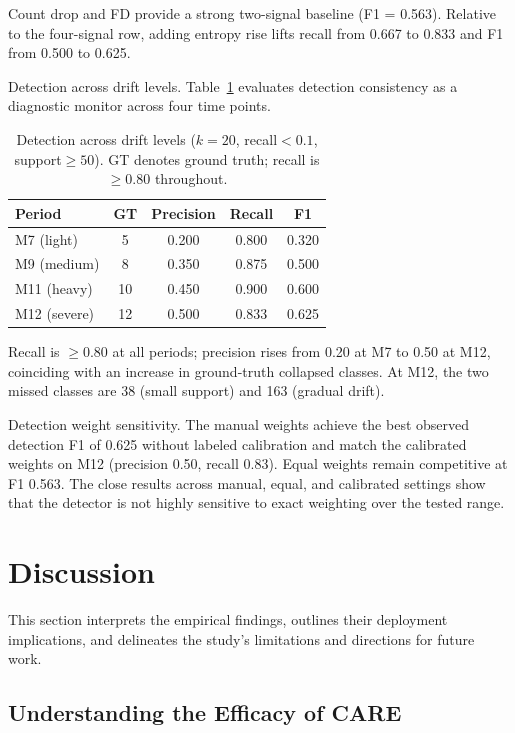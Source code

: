 \documentclass[journal]{IEEEtran}
\newcommand{\ours}{CARE}  %
\begin{document}
Count drop and FD provide a strong two-signal baseline (F1 = 0.563). Relative to the four-signal row, adding entropy rise lifts recall from 0.667 to 0.833 and F1 from 0.500 to 0.625.

Detection across drift levels.
Table~\ref{tab:trigger} evaluates detection consistency as a diagnostic monitor across four time points.

\begin{table}[!htbp]
\centering
\caption{Detection across drift levels ($k{=}20$, recall${<}0.1$, support${\geq}50$). GT denotes ground truth; recall is $\geq$0.80 throughout.}
\label{tab:trigger}
\small
\begin{tabular}{@{}l cccc@{}}
\toprule
Period & GT & Precision & Recall & F1 \\
\midrule
M7 (light)   & 5  & 0.200 & 0.800 & 0.320 \\
M9 (medium)  & 8  & 0.350 & 0.875 & 0.500 \\
M11 (heavy)  & 10 & 0.450 & 0.900 & 0.600 \\
M12 (severe) & 12 & 0.500 & 0.833 & 0.625 \\
\bottomrule
\end{tabular}
\end{table}

Recall is $\geq$0.80 at all periods; precision rises from 0.20 at M7 to 0.50 at M12, coinciding with an increase in ground-truth collapsed classes.
At M12, the two missed classes are 38 (small support) and 163 (gradual drift).

Detection weight sensitivity.
The manual weights achieve the best observed detection F1 of 0.625 without labeled calibration and match the calibrated weights on M12 (precision 0.50, recall 0.83). Equal weights remain competitive at F1 0.563. The close results across manual, equal, and calibrated settings show that the detector is not highly sensitive to exact weighting over the tested range.

\section{Discussion}
\label{sec:discussion}

This section interprets the empirical findings, outlines their deployment implications, and delineates the study's limitations and directions for future work.

\subsection{Understanding the Efficacy of \ours{}}
\label{sec:discussion_efficacy}
\end{document}

